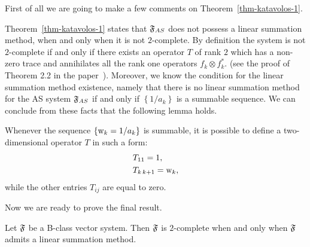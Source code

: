 \documentclass[12pt]{amsart}
\begin{document}
      First of all we are going to make a few comments on Theorem~\ref{thm-katavolos-1}.
      \begin{remark}
      Theorem~\ref{thm-katavolos-1} states that $\mathfrak{F}_{AS}$ does not possess a linear summation method,
        when and only when it is not $2$-complete.
      By definition the system is not $2$-complete if and only if there exists an operator $T$ of rank $2$
        which has a non-zero trace and annihilates all the rank one operators $f_k \otimes f^*_k$.
        (see the proof of Theorem 2.2 in the paper~\cite{katavolos}).
      Moreover, we know the condition for the linear summation method existence, namely that
        there is no linear summation method for the AS system $\mathfrak{F}_{AS}$ if and only if $\left\{1/a_k\right\}$
        is a summable sequence.
        We can conclude from these facts that the following lemma holds.
        \begin{lemma}
          \label{as-lemma}
          Whenever the sequence $\left\{\mathrm{w}_k = 1/a_k\right\}$ is summable,
            it is possible to define a two-dimensional operator $T$ in such a form:
          \begin{align*}
            &T_{11} = 1,\\
            &T_{k\, k+1} = \mathrm{w}_k,
          \end{align*}
          while the other entries $T_{ij}$ are equal to zero.
        \end{lemma}
      \end{remark}
      Now we are ready to prove the final result.
      \begin{theorem}
        \label{completeness-thm}
        Let $\mathfrak{F}$ be a B-class vector system.
        Then $\mathfrak{F}$ is $2$-complete when and only when $\mathfrak{F}$ admits a linear summation method.
      \end{theorem}
\end{document}
